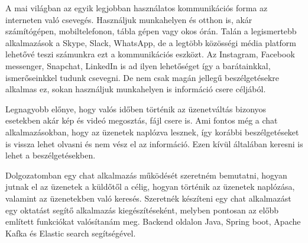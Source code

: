 
A mai világban az egyik legjobban használatos kommunikációs forma az interneten való csevegés. Használjuk munkahelyen és otthon is, akár számítógépen, mobiltelefonon, tábla gépen vagy okos órán.  Talán a legismertebb alkalmazások a Skype, Slack, WhatsApp, de a legtöbb közösségi média platform lehetővé teszi számunkra ezt a kommunikációs eszközt. Az Instagram, Facebook messenger, Snapchat, LinkedIn is ad ilyen lehetőséget így a barátainkkal, ismerőseinkkel tudunk csevegni. De nem csak magán jellegű beszélgetésekre alkalmas ez, sokan használjuk munkahelyen is információ csere céljából.

Legnagyobb előnye, hogy valós időben történik az üzenetváltás bizonyos esetekben akár kép és videó megosztás, fájl csere is.  Ami fontos még a chat alkalmazásokban, hogy az üzenetek naplózva lesznek, így korábbi beszélgetéseket is vissza lehet olvasni és nem vész el az információ. Ezen kívül általában keresni is lehet a beszélgetésekben.

Dolgozatomban egy chat alkalmazás működését szeretném bemutatni, hogyan jutnak el az üzenetek a küldőtől a célig, hogyan történik az üzenetek naplózása, valamint az üzenetekben való keresés.  Szeretnék készíteni egy chat alkalmazást egy oktatást segítő alkalmazás kiegészítéseként, melyben pontosan az előbb említett funkciókat valósítanám meg. Backend oldalon Java, Spring boot, Apache Kafka és Elastic search segítségével.

